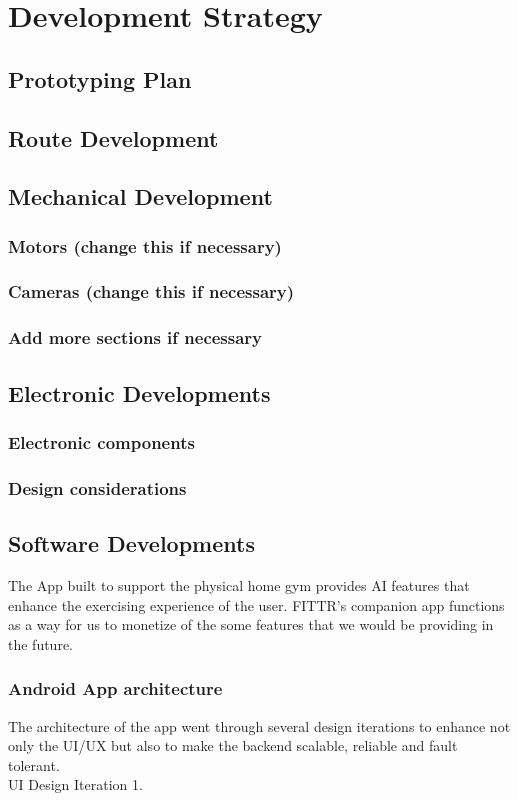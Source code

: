 \documentclass[12pt,oneside,letterpaper,english]{article}
\begin{document}
\section{Development Strategy}
\subsection{Prototyping Plan}
\subsection{Route Development}
\subsection{Mechanical Development}
\subsubsection{Motors (change this if necessary)}
\subsubsection{Cameras (change this if necessary)}
\subsubsection{Add more sections if necessary}
\subsection{Electronic Developments}
\subsubsection{Electronic components}
\subsubsection{Design considerations}

\subsection{Software Developments}
The App built to support the physical home gym provides AI features that enhance the exercising experience of the user. FITTR's companion app functions as a way for us to monetize of the some features that we would be providing in the future. 
\subsubsection{Android App architecture}
The architecture of the app went through several design iterations to enhance not only the UI/UX but also to make the backend scalable, reliable and fault tolerant.
\\
UI Design Iteration 1.
\end{document}
